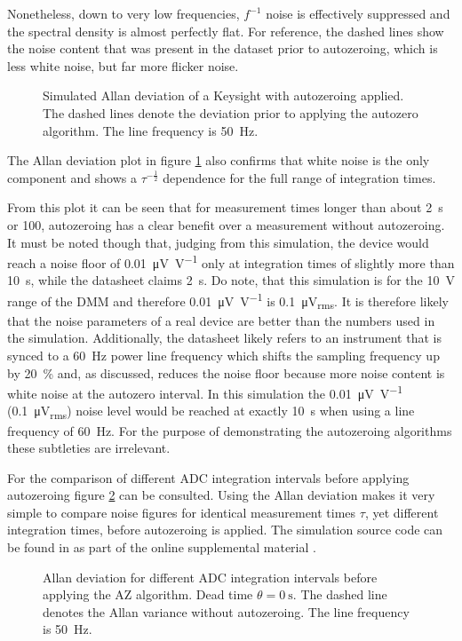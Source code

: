 Nonetheless, down to very low frequencies, $f^{-1}$ noise is effectively suppressed and the spectral density is almost perfectly flat. For reference, the dashed lines show the noise content that was present in the dataset prior to autozeroing, which is less white noise, but far more flicker noise.
\begin{figure}[hb]
    \centering
    \caption{Simulated Allan deviation of a Keysight  with autozeroing applied. The dashed lines denote the deviation prior to applying the autozero algorithm. The line frequency is \qty{50}{\Hz}.}
    \label{fig:autozero_adev}
\end{figure}

The Allan deviation plot in figure \ref{fig:autozero_adev} also confirms that white noise is the only component and shows a $\tau^{-\frac 1 2}$ dependence for the full range of integration times.

From this plot it can be seen that for measurement times longer than about \qty{2}{\s} or \qty{100}{\plc}, autozeroing has a clear benefit over a measurement without autozeroing. It must be noted though that, judging from this simulation, the device would reach a noise floor of \qty[per-mode = symbol]{0.01}{\uV \per \V} only at integration times of slightly more than \qty{10}{\s}, while the datasheet claims \qty{2}{\s}. Do note, that this simulation is for the \qty{10}{\V} range of the DMM and therefore \qty[per-mode = symbol]{0.01}{\uV \per \V} is \qty{0.1}{\uV_{rms}}. It is therefore likely that the noise parameters of a real device are better than the numbers used in the simulation. Additionally, the datasheet likely refers to an instrument that is synced to a \qty{60}{\Hz} power line frequency which shifts the sampling frequency up by \qty{20}{\percent} and, as discussed, reduces the noise floor because more noise content is white noise at the autozero interval. In this simulation the \qty{0.01}{\uV \per \V} (\qty{0.1}{\uV_{rms}}) noise level would be reached at exactly \qty{10}{\s} when using a line frequency of \qty{60}{\Hz}. For the purpose of demonstrating the autozeroing algorithms these subtleties are irrelevant.

For the comparison of different ADC integration intervals before applying autozeroing figure \ref{fig:autozero_nplcs_adev} can be consulted. Using the Allan deviation makes it very simple to compare noise figures for identical measurement times $\tau$, yet different integration times, before autozeroing is applied. The simulation source code can be found in  as part of the online supplemental material \cite{supplemental_material}.
\begin{figure}[ht]
    \centering
    \caption{Allan deviation for different ADC integration intervals before applying the AZ algorithm. Dead time $\theta = \qty{0}{\s}$. The dashed line denotes the Allan variance without autozeroing. The line frequency is \qty{50}{\Hz}.}
    \label{fig:autozero_nplcs_adev}
\end{figure}


